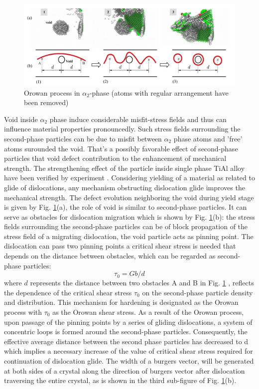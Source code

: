 \documentclass[Unknown,article,submit,moreauthors,pdftex,10pt,a4paper]{Definitions/mdpi}
\begin{document}
\begin{figure}[ht]
	\centering
	\includegraphics[width=1\linewidth]{"img/orowan"}
	\caption{Orowan process in $\alpha_2$-phase (atoms with regular arrangement have been removed)}
	\label{fig:orowan}
\end{figure}
Void inside $\alpha_2$ phase induce considerable misfit-stress fields and thus can influence material properties pronouncedly. Such stress fields surrounding the second-phase particles can be due to misfit between $\alpha_2$ phase atoms and 'free' atoms surounded the void. That's a possibly favorable effect of second-phase particles that void defect contribution to the enhancement of mechanical strength. The strengthening effect of the particle inside single phase TiAl alloy have been verified by experiment \cite{Zghal1998}. Considering yielding of a material as related to glide of dislocations, any mechanism obstructing dislocation glide improves the mechanical strength. The defect evolution neighboring the void during yield stage is given by Fig. \ref{fig:orowan}(a), the role of void is similar to second-phase particles. It can serve as obstacles for dislocation migration which is shown by Fig. \ref{fig:orowan}(b): the stress fields surrounding the second-phase particles can be of block propagation of the stress field of a migrating dislocation, the void particle acts as pinning point. The dislocation can pass two pinning points a critical shear stress is needed that depends on the distance between  obstacles, which can be regarded as second-phase particles\cite{Xiong2015}:
\begin{equation} \label{eq:orowan} 
\tau_0 = Gb/d
\end{equation}
where $d$ represents the distance between two obstacles A and B in Fig. \ref{fig:orowan} , reflects the dependence of the critical shear stress $\tau_0$ on the second-phase particle density and distribution. This mechanism for hardening is designated as the Orowan process with $\tau_0$ as the Orowan shear stress. As a result of the Orowan process, upon passage of the pinning points by a series of gliding dislocations, a system of concentric loops is formed around the second-phase particles. Consequently, the effective average distance between the second phase particles has decreased to d which implies a necessary increase of the value of critical shear stress required for continuation of dislocation glide. The width of a burgers vector, will be generated at both sides of a crystal along the direction of  burgers vector after dislocation traversing the entire crystal, as is shown in the third sub-figure of Fig. \ref{fig:orowan}(b). 
\end{document}
